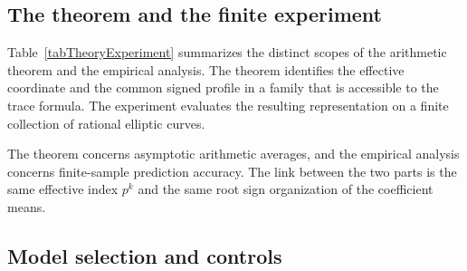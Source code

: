 \documentclass[12pt,reqno]{amsart}
\numberwithin{equation}{section}
\theoremstyle{plain}
\theoremstyle{definition}
\theoremstyle{remark}
\begin{document}
\subsection{The theorem and the finite experiment}

Table~\ref{tabTheoryExperiment} summarizes the distinct scopes of the arithmetic theorem and the empirical analysis.
The theorem identifies the effective coordinate and the common signed profile in a family that is accessible to the trace formula.
The experiment evaluates the resulting representation on a finite collection of rational elliptic curves.

\begin{table}[t]
\centering
\caption{The theoretical family and the finite data experiment.}
\label{tabTheoryExperiment}
\end{table}

The theorem concerns asymptotic arithmetic averages, and the empirical analysis concerns finite-sample prediction accuracy.
The link between the two parts is the same effective index $p^k$ and the same root sign organization of the coefficient means.

\subsection{Model selection and controls}
\end{document}
